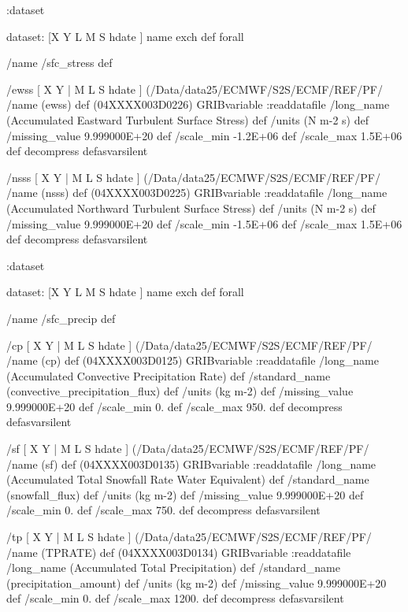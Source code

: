 \begin{ingrid}
{:dataset

dataset:
[X Y L M S hdate ] {name exch def } forall

/name /sfc_stress def

/ewss { [ X Y | M L S hdate ] (/Data/data25/ECMWF/S2S/ECMF/REF/PF/%
/name (ewss) def
(04XXXX003D0226) GRIBvariable
:readdatafile
/long_name (Accumulated Eastward Turbulent Surface Stress) def
/units (N m-2 s) def
/missing_value 9.999000E+20 def
/scale_min -1.2E+06 def
/scale_max 1.5E+06 def
decompress
} defasvarsilent

/nsss { [ X Y | M L S hdate ] (/Data/data25/ECMWF/S2S/ECMF/REF/PF/%
/name (nsss) def
(04XXXX003D0225) GRIBvariable
:readdatafile
/long_name (Accumulated Northward Turbulent Surface Stress) def
/units (N m-2 s) def
/missing_value 9.999000E+20 def
/scale_min -1.5E+06 def
/scale_max 1.5E+06 def
decompress
} defasvarsilent

:dataset

dataset:
[X Y L M S hdate ] {name exch def } forall

/name /sfc_precip def

/cp { [ X Y | M L S hdate ] (/Data/data25/ECMWF/S2S/ECMF/REF/PF/%
/name (cp) def
(04XXXX003D0125) GRIBvariable
:readdatafile
/long_name (Accumulated Convective Precipitation Rate) def
/standard_name (convective_precipitation_flux) def
/units (kg m-2) def
/missing_value 9.999000E+20 def
/scale_min 0. def
/scale_max 950. def
decompress
} defasvarsilent

/sf { [ X Y | M L S hdate ] (/Data/data25/ECMWF/S2S/ECMF/REF/PF/%
/name (sf) def
(04XXXX003D0135) GRIBvariable
:readdatafile
/long_name (Accumulated Total Snowfall Rate Water Equivalent) def
/standard_name (snowfall_flux) def
/units (kg m-2) def
/missing_value 9.999000E+20 def
/scale_min 0. def
/scale_max 750. def
decompress
} defasvarsilent

/tp { [ X Y | M L S hdate ] (/Data/data25/ECMWF/S2S/ECMF/REF/PF/%
/name (TPRATE) def
(04XXXX003D0134) GRIBvariable
:readdatafile
/long_name (Accumulated Total Precipitation) def
/standard_name (precipitation_amount) def 
/units (kg m-2) def
/missing_value 9.999000E+20 def
/scale_min 0. def
/scale_max 1200. def
decompress
} defasvarsilent

}
\end{ingrid}
